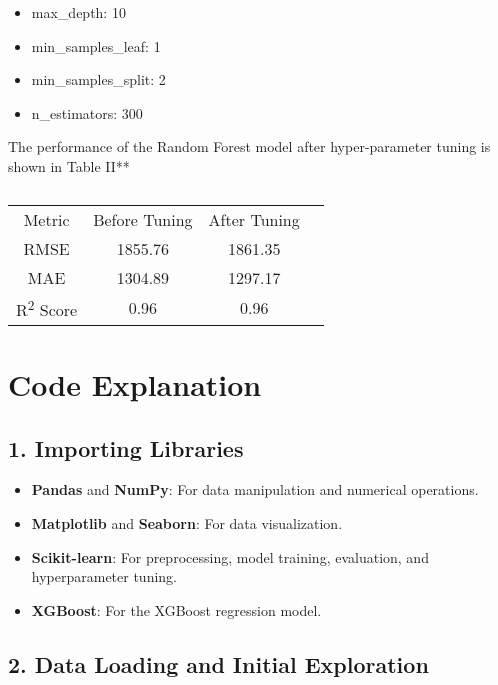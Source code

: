 \documentclass[journal]{IEEEtran}
\begin{document}
\begin{itemize}
    \item max\_depth: 10
    \item min\_samples\_leaf: 1
    \item min\_samples\_split: 2
    \item n\_estimators: 300
\end{itemize}
The performance of the Random Forest model after hyper-parameter tuning is shown in Table II**

\begin{table}
    \centering
    \begin{tabular}{cccc}
        Metric & Before Tuning & After Tuning \\
        RMSE & 1855.76 & 1861.35 \\
        MAE & 1304.89 & 1297.17 \\
        R\textsuperscript{2} Score & 0.96 & 0.96  \\
    \end{tabular}
    \caption{}
    \label{tab:Random Forest Metrics}
\end{table}
\section{Code Explanation}

\subsection{1. Importing Libraries}

\begin{itemize}
    \item \textbf{Pandas} and \textbf{NumPy}: For data manipulation and numerical operations.
    \item \textbf{Matplotlib} and \textbf{Seaborn}: For data visualization.
    \item \textbf{Scikit-learn}: For preprocessing, model training, evaluation, and hyperparameter tuning.
    \item \textbf{XGBoost}: For the XGBoost regression model.
\end{itemize}

\subsection{2. Data Loading and Initial Exploration}
\end{document}
